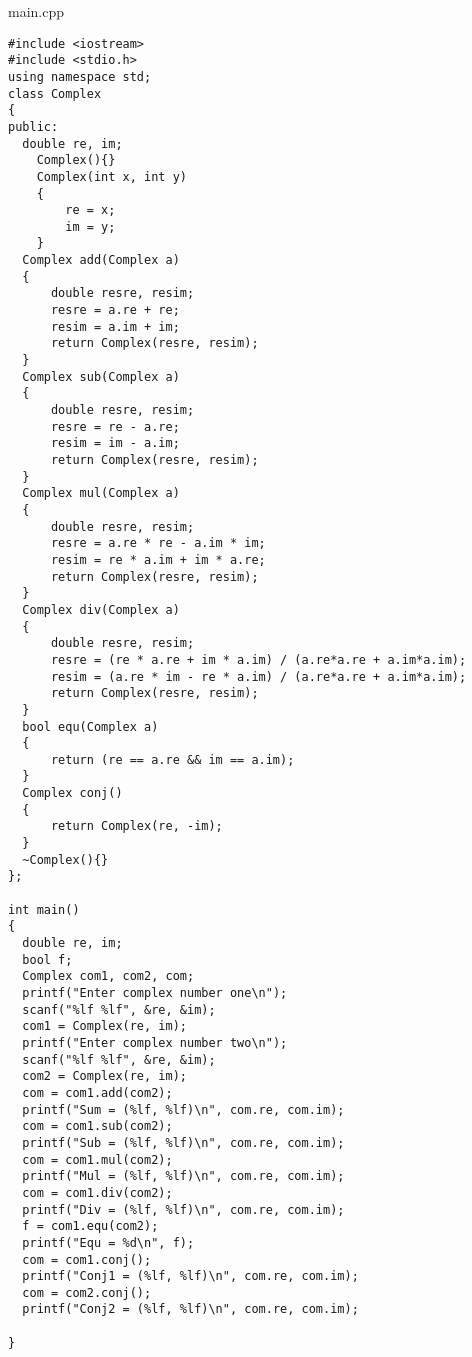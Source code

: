 \documentclass[12pt]{article}
\begin{document}
{\Huge main.cpp}
\begin{verbatim}
#include <iostream> 
#include <stdio.h>
using namespace std;
class Complex 
{
public:  
  double re, im; 
    Complex(){}
    Complex(int x, int y)
    {
        re = x;
        im = y;
    }
  Complex add(Complex a)
  {
      double resre, resim;
      resre = a.re + re;
      resim = a.im + im;
      return Complex(resre, resim);
  }
  Complex sub(Complex a)
  {
      double resre, resim;
      resre = re - a.re;
      resim = im - a.im;
      return Complex(resre, resim);
  }
  Complex mul(Complex a)
  {
      double resre, resim;
      resre = a.re * re - a.im * im;
      resim = re * a.im + im * a.re;
      return Complex(resre, resim);
  }
  Complex div(Complex a)
  {
      double resre, resim;
      resre = (re * a.re + im * a.im) / (a.re*a.re + a.im*a.im);
      resim = (a.re * im - re * a.im) / (a.re*a.re + a.im*a.im);
      return Complex(resre, resim);
  }
  bool equ(Complex a)
  {
      return (re == a.re && im == a.im);
  }
  Complex conj()
  {
      return Complex(re, -im);
  }
  ~Complex(){}
};

int main()
{
  double re, im;
  bool f;
  Complex com1, com2, com;
  printf("Enter complex number one\n");
  scanf("%lf %lf", &re, &im);
  com1 = Complex(re, im);
  printf("Enter complex number two\n");
  scanf("%lf %lf", &re, &im);
  com2 = Complex(re, im);
  com = com1.add(com2);
  printf("Sum = (%lf, %lf)\n", com.re, com.im);
  com = com1.sub(com2);
  printf("Sub = (%lf, %lf)\n", com.re, com.im);
  com = com1.mul(com2);
  printf("Mul = (%lf, %lf)\n", com.re, com.im);
  com = com1.div(com2);
  printf("Div = (%lf, %lf)\n", com.re, com.im);
  f = com1.equ(com2);
  printf("Equ = %d\n", f);
  com = com1.conj();
  printf("Conj1 = (%lf, %lf)\n", com.re, com.im);
  com = com2.conj();
  printf("Conj2 = (%lf, %lf)\n", com.re, com.im);
  
}
\end{verbatim}
    \pagebreak
\end{document}
